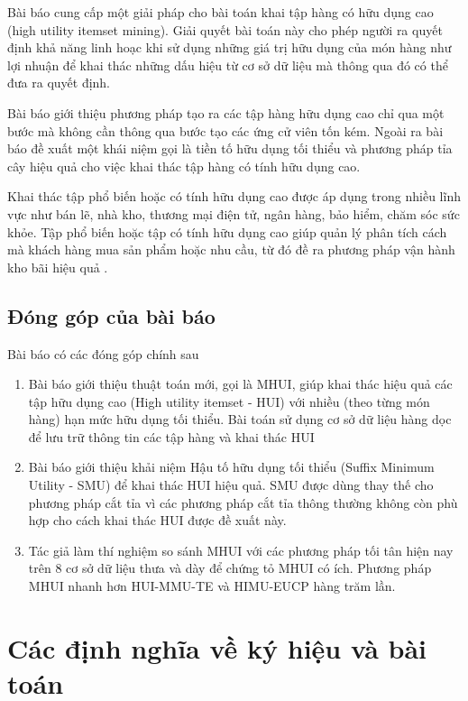Bài báo cung cấp một giải pháp cho bài toán khai tập hàng có hữu dụng cao (high utility itemset mining). Giải quyết bài toán này cho phép người ra quyết định khả năng linh hoạc khi sử dụng những giá trị hữu dụng của món hàng như lợi nhuận để khai thác những dấu hiệu từ cơ sở dữ liệu mà thông qua đó có thể đưa ra quyết định.  

Bài báo giới thiệu phương pháp tạo ra các tập hàng hữu dụng cao chỉ qua một bước mà không cần thông qua bước tạo các ứng cử viên tốn kém. Ngoài ra bài báo đề xuất một khái niệm gọi là tiền tố hữu dụng tối thiểu và phương pháp tỉa cây hiệu quả cho việc khai thác tập hàng có tính hữu dụng cao. 

Khai thác tập phổ biến hoặc có tính hữu dụng cao được áp dụng trong nhiều lĩnh vực như bán lẽ, nhà kho, thương mại điện tử, ngân hàng, bảo hiểm, chăm sóc sức khỏe. Tập phổ biến hoặc tập có tính hữu dụng cao giúp quản lý phân tích cách mà khách hàng mua sản phẩm hoặc nhu cầu, từ đó đề ra phương pháp vận hành kho bãi hiệu quả \cite{chen2005aggregation, chen2005association}.

\subsection{Đóng góp của bài báo}

Bài báo có các đóng góp chính sau

\begin{enumerate}
  \item Bài báo giới thiệu thuật toán mới, gọi là MHUI, giúp khai thác hiệu quả các tập hữu dụng cao (High utility itemset - HUI) với nhiều (theo từng món hàng) hạn mức hữu dụng tối thiểu. Bài toán sử dụng cơ sở dữ liệu hàng dọc để lưu trữ thông tin các tập hàng và khai thác HUI
  \item Bài báo giới thiệu khải niệm Hậu tố hữu dụng tối thiểu (Suffix Minimum Utility - SMU) để khai thác HUI hiệu quả. SMU được dùng thay thế cho phương pháp cắt tỉa vì các phương pháp cắt tỉa thông thường không còn phù hợp cho cách khai thác HUI được đề xuất này.
  \item Tác giả làm thí nghiệm so sánh MHUI với các phương pháp tối tân hiện nay trên 8 cơ sở dữ liệu thưa và dày để chứng tỏ MHUI có ích. Phương pháp MHUI nhanh hơn HUI-MMU-TE \cite{lin2016efficient} và HIMU-EUCP \cite{gan2016more} hàng trăm lần.  
\end{enumerate}

\section{Các định nghĩa về ký hiệu và bài toán}

